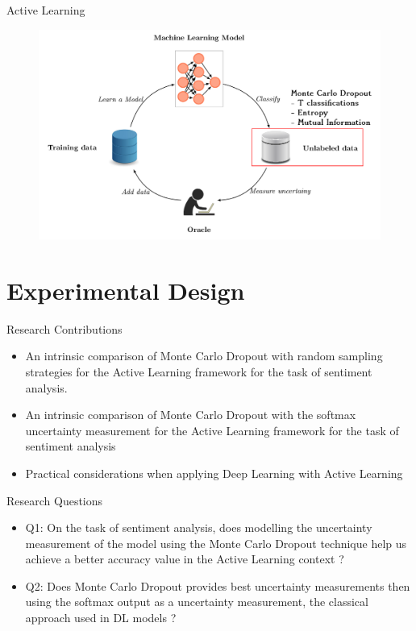 \documentclass[10pt]{beamer}
\begin{document}
\begin{frame}[fragile]{Active Learning}
    \begin{figure}[htp]
        \centering
        \includegraphics[scale=0.3]{images/active_learning_uncertainty_dropout.png}
    \end{figure}
\end{frame}

\section{Experimental Design}

\begin{frame}[fragile]{Research Contributions}
\begin{itemize}
\item An intrinsic comparison of Monte Carlo Dropout with random sampling strategies for the
Active Learning framework for the task of sentiment analysis.
\item An intrinsic comparison of Monte Carlo Dropout with the softmax uncertainty measurement
for the Active Learning framework for the task of sentiment analysis
\item Practical considerations when applying Deep Learning with Active Learning
\end{itemize}
\end{frame}

\begin{frame}[fragile]{Research Questions}
\begin{itemize}
    \item \alert{Q1}: On the task of sentiment analysis, does modelling the uncertainty measurement of the
    model using the Monte Carlo Dropout technique help us achieve a better accuracy value in
    the Active Learning context ?
    \vspace{0.5cm}
    \item \alert{Q2}: Does Monte Carlo Dropout
    provides best uncertainty measurements then using the softmax output as a uncertainty measurement, the classical approach used in DL models ?
\end{itemize}
\end{frame}
\end{document}
